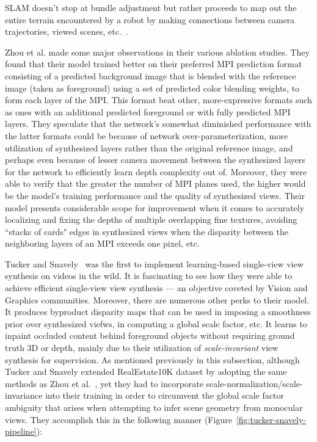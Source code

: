 SLAM doesn't stop at bundle adjustment but rather proceeds to map out the entire terrain encountered by a robot by making connections between camera trajectories, viewed scenes, etc.~\cite{noauthor_what_nodate}. 

Zhou et al. made some major observations in their various ablation studies. They found that their model trained better on their preferred MPI prediction format consisting of a predicted background image that is blended with the reference image (taken as foreground) using a set of predicted color blending weights, to form each layer of the MPI. This format beat other, more-expressive formats such as ones with an additional predicted foreground or with fully predicted MPI layers. They speculate that the network's somewhat diminished performance with the latter formats could be because of network over-parameterization, more utilization of synthesized layers rather than the original reference image, and perhaps even because of lesser camera movement between the synthesized layers for the network to efficiently learn depth complexity out of. Moreover, they were able to verify that the greater the number of MPI planes used, the higher would be the model's training performance and the quality of synthesized views. Their model presents considerable scope for improvement when it comes to accurately localizing and fixing the depths of multiple overlapping fine textures, avoiding ``stacks of cards" edges in synthesized views when the disparity between the neighboring layers of an MPI exceeds one pixel, etc.

Tucker and Snavely~\cite{single_view_mpi} was the first to implement learning-based single-view view synthesis on videos in the wild. It is fascinating to see how they were able to achieve efficient single-view view synthesis --- an objective coveted by Vision and Graphics communities. Moreover, there are numerous other perks to their model. It produces byproduct disparity maps that can be used in imposing a smoothness prior over synthesized viefws, in computing a global scale factor, etc. It learns to inpaint occluded content behind foreground objects without requiring ground truth 3D or depth, mainly due to their utilization of \textit{scale-invariant} view synthesis for supervision. As mentioned previously in this subsection, although Tucker and Snavely extended RealEstate10K dataset by adopting the same methods as Zhou et al.~\cite{zhou2018stereo}, yet they had to incorporate scale-normalization/scale-invariance into their training in order to circumvent the global scale factor ambiguity that arises when attempting to infer scene geometry from monocular views. They accomplish this in the following manner (Figure~\ref{fig:tucker-snavely-pipeline}):


